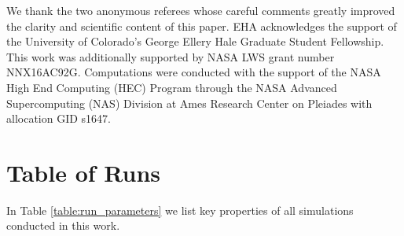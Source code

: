 \documentclass[aps, pre, onecolumn, nofootinbib, notitlepage, groupedaddress, amsfonts, amssymb, amsmath, longbibliography]{revtex4-1}
\begin{document}
\begin{acknowledgments}
We thank the two anonymous referees whose careful comments greatly 
improved the clarity and scientific content of this paper.
EHA acknowledges the support of the University of Colorado's George 
Ellery Hale Graduate Student Fellowship.
This work was additionally supported by  NASA LWS grant number NNX16AC92G.  
Computations were conducted 
with the support of the NASA High End Computing (HEC) Program through the NASA 
Advanced Supercomputing (NAS) Division at Ames Research Center on Pleiades
with allocation GID s1647.
\end{acknowledgments}


\appendix
\section{Table of Runs}
\label{appendix:run_table}
In Table \ref{table:run_parameters} we list key properties of all simulations
conducted in this work.  
\end{document}
